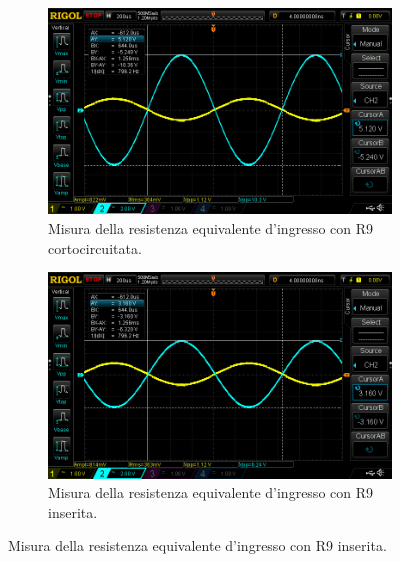 \documentclass[a4paper]{article}
\begin{document}
				\begin{figure}[h!]
					\centering
					\begin{subfigure}{0.4\textwidth}
						\centering
						\includegraphics[scale=0.2]{misuraDellaResistenzaEquivalenteInIngressoAmplificatoreInvertenteR9InCorto}
						\caption{Misura della resistenza equivalente d'ingresso con R9 cortocircuitata.}
					\end{subfigure}
					\begin{subfigure}{0.4\textwidth}
						\centering
						\includegraphics[scale=0.2]{misuraDellaResistenzaEquivalenteInIngressoAmplificatoreInvertenteR9Inserita}
						\caption{Misura della resistenza equivalente d'ingresso con R9 inserita.}
					\end{subfigure}
					\label{fig:misuraDellaResistenzaEquivalenteInIngressoAmplificatoreInvertente}
				\end{figure}
\end{document}
